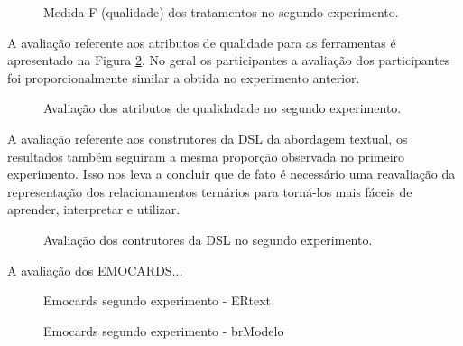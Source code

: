 \begin{figure}[!htb]
        \centering
        \caption{Medida-F (qualidade) dos tratamentos no segundo experimento.}
        \label{fig:boxplotMedidaF2}
        
\end{figure}

A avaliação referente aos atributos de qualidade para as ferramentas é apresentado na Figura \ref{fig:inst3GERALExp2}.
No geral os participantes a avaliação dos participantes foi proporcionalmente similar a obtida no experimento anterior. 

\begin{figure}[!htb]
    \centering
    \caption{Avaliação dos atributos de qualidadade no segundo experimento.}
    \label{fig:inst3GERALExp2}
    
\end{figure}

A avaliação referente aos construtores da DSL da abordagem textual, os resultados também seguiram a mesma proporção observada no primeiro experimento.
Isso nos leva a concluir que de fato é necessário uma reavaliação da representação dos relacionamentos ternários para torná-los mais fáceis de aprender, interpretar e utilizar.

\begin{figure}[!htb]
    \centering
    \caption{Avaliação dos contrutores da DSL no segundo experimento.}
    \label{fig:inst4GERALExp2}
    
\end{figure}

\clearpage

A avaliação dos EMOCARDS...

\begin{figure}[!htb]
    \centering
    \caption{Emocards segundo experimento - ERtext}
    \label{fig:Emocards1_alt}
    
\end{figure}

\begin{figure}[!htb]
    \centering
    \caption{Emocards segundo experimento - brModelo}
    \label{fig:Emocards2_alt}
    
\end{figure}


